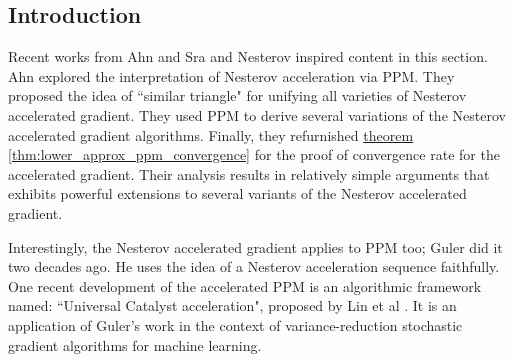 
\subsection{Introduction}
    Recent works from Ahn and Sra \cite{ahn_understanding_2022} and Nesterov \cite{nesterov_lectures_2018} inspired content in this section.
    Ahn explored the interpretation of Nesterov acceleration via PPM. 
    They proposed the idea of ``similar triangle" for unifying all varieties of Nesterov accelerated gradient. 
    They used PPM to derive several variations of the Nesterov accelerated gradient algorithms. 
    Finally, they refurnished \hyperref[thm:lower_approx_ppm_convergence]{theorem \ref*{thm:lower_approx_ppm_convergence}} for the proof of convergence rate for the accelerated gradient.
    Their analysis results in relatively simple arguments that exhibits powerful extensions to several variants of the Nesterov accelerated gradient. 

    \par\noindent
    Interestingly, the Nesterov accelerated gradient applies to PPM too; Guler \cite{guler_new_1992} did it two decades ago. 
    He uses the idea of a Nesterov acceleration sequence faithfully. 
    One recent development of the accelerated PPM is an algorithmic framework named: ``Universal Catalyst acceleration", proposed by Lin et al \cite{lin_universal_2015}. 
    It is an application of Guler's work in the context of variance-reduction stochastic gradient algorithms for machine learning. 

